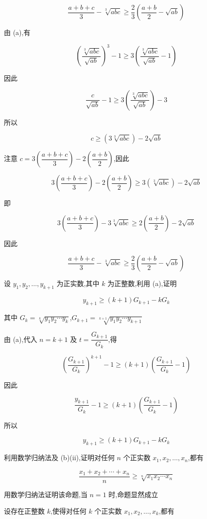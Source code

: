 \begin{questions}
\begin{parts}
\begin{subparts}
\[
\frac{a+b+c}{3} - \sqrt[3]{abc} \geq \frac{2}{3}\left(\frac{a+b}{2}-\sqrt{ab}\right)
\]
\begin{solution}
由 (a),有

\[
\left(\frac{\sqrt[3]{abc}}{\sqrt{ab}}\right)^3 - 1 \geq 3\left(\frac{\sqrt[3]{abc}}{\sqrt{ab}}-1\right)
\]

因此

\[
\frac{c}{\sqrt{ab}}-1 \geq 3\left(\frac{\sqrt[3]{abc}}{\sqrt{ab}}\right)-3
\]

所以

\[
c \geq \left(3\sqrt[3]{abc}\right)-2\sqrt{ab}
\]

注意 $c = 3\left(\dfrac{a+b+c}{3}\right)-2\left(\dfrac{a+b}{2}\right)$,因此

\[
3\left(\frac{a+b+c}{3}\right)-2\left(\frac{a+b}{2}\right) \geq 3\left(\sqrt[3]{abc}\right)-2\sqrt{ab}
\]

即

\[
3\left(\frac{a+b+c}{3}\right)-3\sqrt[3]{abc} \geq 2\left(\frac{a+b}{2}\right)-2\sqrt{ab}
\]

因此

\[
\frac{a+b+c}{3} - \sqrt[3]{abc} \geq \frac{2}{3}\left(\frac{a+b}{2}-\sqrt{ab}\right)
\]
\end{solution}

\subpart 设 $y_1,y_2,\ldots,y_{k+1}$ 为正实数,其中 $k$ 为正整数,利用 (a),证明

\[
y_{k+1} \geq (k+1)G_{k+1} - kG_k
\]

其中 $G_k = \sqrt[k]{y_1 y_2 \cdots y_k}$,$G_{k+1} = \sqrt[k+1]{y_1 y_2 \cdots y_{k+1}}$
\begin{solution}
由 (a),代入 $n=k+1$ 及 $t=\dfrac{G_{k+1}}{G_k}$,得

\[
\left(\frac{G_{k+1}}{G_k}\right)^{k+1} - 1 \geq (k+1)\left(\frac{G_{k+1}}{G_k}-1\right)
\]

因此

\[
\frac{y_{k+1}}{G_k} - 1 \geq (k+1)\left(\frac{G_{k+1}}{G_k}-1\right)
\]

所以

\[
y_{k+1} \geq (k+1)G_{k+1} - kG_k
\]
\end{solution}

\subpart 利用数学归纳法及 (b)(ii),证明对任何 $n$ 个正实数 $x_1,x_2,\ldots,x_n$,都有

\[
\frac{x_1+x_2+\cdots+x_n}{n} \geq \sqrt[n]{x_1 x_2 \cdots x_n}
\]
\begin{solution}
用数学归纳法证明该命题,当 $n=1$ 时,命题显然成立

设存在正整数 $k$,使得对任何 $k$ 个正实数 $x_1,x_2,\ldots,x_k$,都有


\end{solution}
\end{subparts}
\end{parts}
\end{questions}
